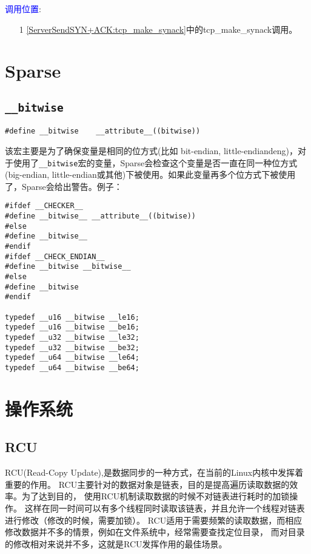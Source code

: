 		\textcolor{blue}{调用位置}:

		\begin{enumerate}
			\item[1]		\ref{ServerSendSYN+ACK:tcp_make_synack}中的tcp\_make\_synack调用。
		\end{enumerate}

	\section{Sparse}

		\subsection{\texttt{__bitwise}}
\begin{verbatim}
#define __bitwise    __attribute__((bitwise))     
\end{verbatim}
		
		该宏主要是为了确保变量是相同的位方式(比如 bit-endian, little-endiandeng)，对于使用了\texttt{__bitwise}宏的变量，Sparse会检查这个变量是否一直在同一种位方式(big-endian, little-endian或其他)下被使用。如果此变量再多个位方式下被使用了，Sparse会给出警告。例子：

\begin{verbatim}
#ifdef __CHECKER__
#define __bitwise__ __attribute__((bitwise))
#else
#define __bitwise__
#endif
#ifdef __CHECK_ENDIAN__
#define __bitwise __bitwise__
#else
#define __bitwise
#endif

typedef __u16 __bitwise __le16;
typedef __u16 __bitwise __be16;
typedef __u32 __bitwise __le32;
typedef __u32 __bitwise __be32;
typedef __u64 __bitwise __le64;
typedef __u64 __bitwise __be64;
\end{verbatim}
		
	\section{操作系统}
		\subsection{RCU}
			\label{Appendix:RCU}
			RCU(Read-Copy Update),是数据同步的一种方式，在当前的Linux内核中发挥着重要的作用。
			RCU主要针对的数据对象是链表，目的是提高遍历读取数据的效率。为了达到目的，
			使用RCU机制读取数据的时候不对链表进行耗时的加锁操作。
			这样在同一时间可以有多个线程同时读取该链表，并且允许一个线程对链表进行修改（修改的时候，需要加锁）。
			RCU适用于需要频繁的读取数据，而相应修改数据并不多的情景，例如在文件系统中，经常需要查找定位目录，
			而对目录的修改相对来说并不多，这就是RCU发挥作用的最佳场景。

